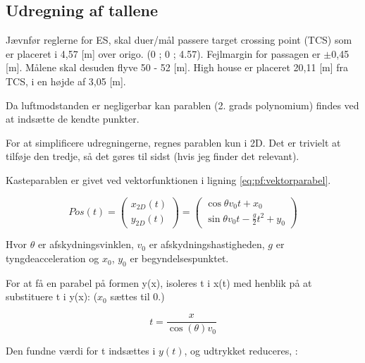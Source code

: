 \subsection{Udregning af tallene}
\label{sec:udregning_af_parabel}


Jævnfør reglerne for ES, skal duer/mål passere target crossing point (TCS) som er 
placeret i 4,57 [m] over origo. (0 ; 0 ; 4.57). Fejlmargin for passagen er \(\pm\)0,45 [m]. 
Målene skal desuden flyve 50 - 52 [m].  High house er placeret 20,11 [m] fra TCS, i en 
højde af 3,05 [m]. 

Da luftmodstanden er negligerbar kan parablen (2. grads polynomium) findes ved at indsætte de kendte punkter. 

For at simplificere udregningerne, regnes parablen kun i 2D. Det er trivielt at tilføje den tredje, så det gøres til sidst (hvis jeg finder det relevant). 

Kasteparablen er givet ved vektorfunktionen i ligning  \ref{eq:pf:vektorparabel}.

\begin{equation}
	Pos(t) = \left( \begin{array}{c}
	x_{2D}(t) \\
	y_{2D}(t)
	\end{array}
	\right)
	= \left( \begin{array}{c}
	\cos \theta v_0 t + x_0 \\
	\sin \theta v_0 t - \frac{g}{2} t^2 + y_0
	\end{array}
	\right)
\label{eq:pf:vektorparabel}
\end{equation}

Hvor \(\theta\) er afskydningsvinklen, \(v_0\) er afskydningshastigheden, \(g\) er tyngdeacceleration og \(x_0\), \(y_0\) er begyndelsespunktet. 

For at få en parabel på formen y(x), isoleres t i x(t) med henblik på at substituere t i y(x): (\(x_0\) sættes til 0.)

\begin{equation}
t = \frac{x}{\cos \left( \theta \right) v_0}
\label{eq:pf:x(t)}
\end{equation}

Den fundne værdi for t indsættes i \(y(t)\), og udtrykket reduceres, \citep[Side. 67]{fund_of_physics}: 

